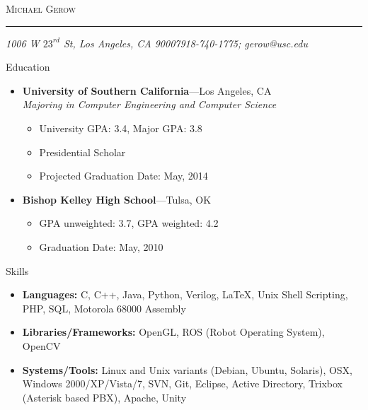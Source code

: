 \documentclass[10pt,oneside]{article}
\makeatletter
\newcommand{\name}{Michael Gerow}
\newcommand{\addr}{1006 W $23^{rd}$ St, Los Angeles, CA 90007}
\newcommand{\phone}{918-740-1775}
\newcommand{\email}{gerow@usc.edu}
\newcommand{\bigname}[1]{
	\begin{center}\fontfamily{phv}\selectfont\Huge\scshape#1\end{center}
}
\newenvironment{ressection}[1]{
	\vspace{4pt}
	{\fontfamily{phv}\selectfont\Large#1}
	\begin{itemize}
	\vspace{3pt}
}{
	\end{itemize}
}
\newcommand{\resitem}[1]{
	\vspace{-4pt}
	\item \begin{flushleft} #1 \end{flushleft}
}
\newcommand{\ressubitem}[1]{
	\vspace{-1pt}
	\item \begin{flushleft} #1 \end{flushleft}
}
\newcommand{\resbigitem}[3]{
	\vspace{-5pt}
	\item
	\textbf{#1}---#2 \\
	\textit{#3}
}
\newcommand{\resshortbigitem}[2]{
	\vspace{-5pt}
	\item
	\textbf{#1}---#2
}
\newenvironment{ressubsec}[3]{
	\resbigitem{#1}{#2}{#3}
	\vspace{-2pt}
	\begin{itemize}
}{
	\end{itemize}
}
\newenvironment{resshortsubsec}[2]{
	\resshortbigitem{#1}{#2}
	\vspace{-2pt}
	\begin{itemize}
}{
	\end{itemize}
}
\makeatother
\begin{document}
 \selectfont

\bigname{\name}

\vspace{-8pt} \rule{\textwidth}{1pt}

\vspace{-1pt} {\small\itshape \addr \hfill \phone; \email}

\vspace{8 pt}




\begin{ressection}{Education}

	\begin{ressubsec}{University of Southern California}{Los Angeles, CA}{Majoring in Computer Engineering and Computer Science}
		\ressubitem{University GPA:  3.4, Major GPA: 3.8}
		\ressubitem{Presidential Scholar}
		\ressubitem{Projected Graduation Date:  May, 2014}
	\end{ressubsec}
	\begin{resshortsubsec}{Bishop Kelley High School}{Tulsa, OK}{}
		\ressubitem{GPA unweighted: 3.7, GPA weighted: 4.2}
		\ressubitem{Graduation Date: May, 2010}
	\end{resshortsubsec}

\end{ressection}

\begin{ressection}{Skills}

	\resitem{\textbf{Languages:} C, C++, Java, Python, Verilog, \LaTeX, Unix Shell Scripting, PHP, SQL, Motorola 68000 Assembly }
	\resitem{\textbf{Libraries/Frameworks:} OpenGL, ROS (Robot Operating System), OpenCV }
	\resitem{\textbf{Systems/Tools:} Linux and Unix variants (Debian, Ubuntu, Solaris), OSX, Windows 2000/XP/Vista/7, SVN, Git, Eclipse, Active Directory, Trixbox (Asterisk based PBX), Apache, Unity }
	
\end{ressection}


\end{document}
